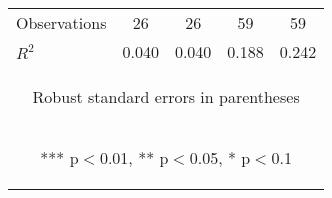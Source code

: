 \begin{center}
\begin{tabular}{lcccc}
Observations & 26 & 26 & 59 & 59 \\
 $R^2$ & 0.040 & 0.040 & 0.188 & 0.242 \\ \hline
\multicolumn{5}{c}{\begin{footnotesize} Robust standard errors in parentheses\end{footnotesize}} \\
\multicolumn{5}{c}{\begin{footnotesize} *** p$<$0.01, ** p$<$0.05, * p$<$0.1\end{footnotesize}} \\
\end{tabular}
\end{center}
